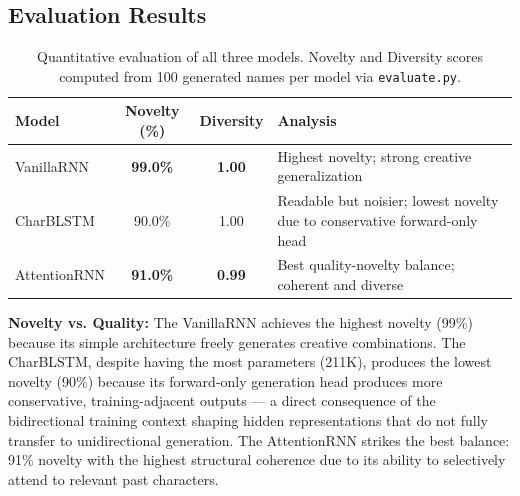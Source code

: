 \documentclass[11pt,a4paper]{article}
\begin{document}
\subsection{Evaluation Results}

\begin{table}[H]
    \centering
    \renewcommand{\arraystretch}{1.4}
    \begin{tabular}{@{} l c c p{7cm} @{}}
        \toprule
        \textbf{\color{iitjblue} Model} & \textbf{\color{iitjblue} Novelty (\%)} & \textbf{\color{iitjblue} Diversity} & \textbf{\color{iitjblue} Analysis} \\
        \midrule
        VanillaRNN & \textbf{\textcolor{accentgreen}{99.0\%}} & \textbf{\textcolor{accentgreen}{1.00}} & Highest novelty; strong creative generalization \\
        \rowcolor{highlightbg}
        CharBLSTM  & 90.0\% & 1.00 & Readable but noisier; lowest novelty due to conservative forward-only head \\
        AttentionRNN & \textbf{\textcolor{accentgreen}{91.0\%}} & \textbf{\textcolor{accentgreen}{0.99}} & Best quality-novelty balance; coherent and diverse \\
        \bottomrule
    \end{tabular}
    \vspace{0.5em}
    \caption{Quantitative evaluation of all three models. Novelty and Diversity scores computed from 100 generated names per model via \texttt{evaluate.py}.}
    \label{tab:eval}
\end{table}

\begin{resultBox}
\textbf{Novelty vs. Quality:} The VanillaRNN achieves the highest novelty (99\%) because its simple architecture freely generates creative combinations. The CharBLSTM, despite having the most parameters (211K), produces the lowest novelty (90\%) because its forward-only generation head produces more conservative, training-adjacent outputs — a direct consequence of the bidirectional training context shaping hidden representations that do not fully transfer to unidirectional generation. The AttentionRNN strikes the best balance: 91\% novelty with the highest structural coherence due to its ability to selectively attend to relevant past characters.
\end{resultBox}

\clearpage
\end{document}
